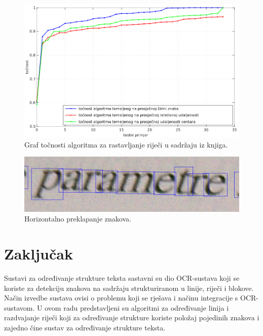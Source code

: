 \documentclass[times, utf8, zavrsni]{fer}
\begin{document}
\begin{figure}[htb]
    \centering
    \captionsetup{justification=centering,margin=2cm}
    \includegraphics[width=\textwidth]{images/result-04.png}
    \caption{
        Graf točnosti algoritma za rastavljanje riječi u sadržaju iz knjiga.
    }
    \label{fig:result-04}
\end{figure}

\begin{figure}[htb]
    \centering
    \captionsetup{justification=centering,margin=2cm}
    \includegraphics[width=\textwidth]{images/error-02.png}
    \caption{
        Horizontalno preklapanje znakova.
    }
    \label{fig:error-02}
\end{figure}


























\chapter{Zaključak}
Sustavi za određivanje strukture teksta sastavni su dio OCR-sustava koji se
koriste za detekciju znakova na sadržaju strukturiranom u linije, riječi i
blokove. Način izvedbe sustava ovisi o problemu koji se rješava i načinu
integracije s OCR-sustavom. U ovom radu predstavljeni su algoritmi za
određivanje linija i razdvajanje riječi koji za određivanje
strukture koriste položaj pojedinih znakova i zajedno čine sustav za određivanje
strukture teksta.
\end{document}
